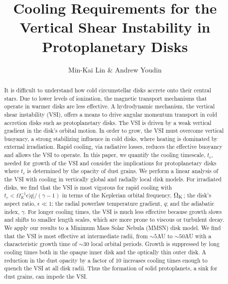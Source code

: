 \documentclass[iop]{emulateapj}
\def \OmK {\Omega_{\rm K}}
\begin{document}
\title{Cooling Requirements for the Vertical Shear Instability 
  in Protoplanetary Disks}
\author{Min-Kai Lin \& Andrew Youdin}

\begin{abstract}
  It is difficult to understand how cold circumstellar disks accrete onto their central stars.  Due to 
  lower levels of ionization, the magnetic transport mechanisms that operate in warmer disks are less effective. 
  A hydrodynamic mechanism, the vertical shear instability (VSI), offers a means to drive angular momentum 
  transport in cold accretion disks such as protoplanetary disks.  
  The VSI is driven by a weak vertical gradient in the disk's orbital motion.
  In order to grow, the VSI must overcome vertical buoyancy, a strong stabilizing influence in cold disks, where 
  heating is dominated by external irradiation.  Rapid cooling, via radiative losses, reduces the effective buoyancy
  and allows the VSI to operate.  In this paper, we quantify the cooling timescale, $t_c$, needed for growth of the VSI
  and consider the implications for protoplanetary disks where $t_c$ is determined by the opacity of dust 
  grains.  We perform a linear analysis of the VSI with cooling in vertically global and radially local disk models.
  For irradiated disks, we find that the VSI is most vigorous for rapid cooling with $t_c < \Omega_K^{-1} \epsilon |q| / (\gamma -1)$
  in terms of the Keplerian orbital frequency, $\OmK$; the disk's aspect ratio, $\epsilon \ll 1$; the radial 
  powerlaw temperature gradient, $q$; and the adiabatic index, $\gamma$.  For longer cooling times, the VSI 
  is much less effective because growth slows and shifts to smaller length scales, which are more prone to 
  viscous or turbulent decay.  We apply our results to a  Minimum Mass Solar Nebula (MMSN) disk model.  We
  find that the VSI is most effective at intermediate radii, from $\sim 5$AU to $\sim 50$AU with a
  characteristic growth time of $\sim 30$ local orbital periods.  Growth is suppressed by long cooling times both in the opaque 
  inner disk and the optically thin outer disk.  A reduction in the dust opacity by a factor of 10 increases cooling times 
  enough to quench the VSI at all disk radii.  Thus the formation of solid protoplanets, a sink for dust grains, can impede the VSI.


\end{abstract}
\end{document}
